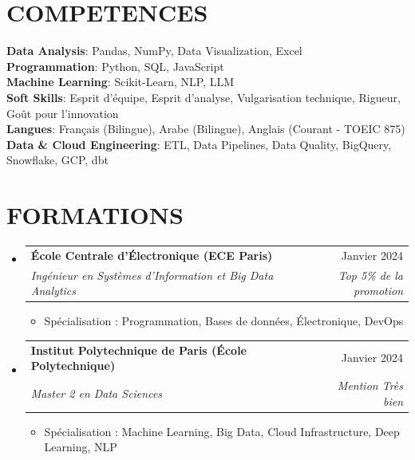 \documentclass[11pt,a4paper]{article}
\makeatletter
\newcommand{\resumeItem}[1]{
  \item\footnotesize{
    {#1 \vspace{-1pt}}
  }
}
\newcommand{\resumeSubheading}[4]{
  \vspace{2pt}\item
    \begin{tabular*}{\textwidth}[t]{l@{\extracolsep{\fill}}r}
      {\footnotesize\textbf{#1}} & {\footnotesize#2} \\
      {\footnotesize\textit{#3}} & {\footnotesize\textit{#4}} \\
    \end{tabular*}\vspace{2pt}
}
\newcommand{\resumeSubHeadingListStart}{\begin{itemize}[leftmargin=0in, label={}]}
\newcommand{\resumeSubHeadingListEnd}{\end{itemize}}
\newcommand{\resumeItemListStart}{\begin{itemize}[label={\textbullet}]}
\newcommand{\resumeItemListEnd}{\end{itemize}\vspace{0pt}}
\makeatother
\begin{document}
\section{COMPETENCES}
\begin{itemize}[leftmargin=0in, label={}]
\footnotesize{\item{
{\footnotesize\textbf{Data Analysis}:} {\footnotesize Pandas, NumPy, Data Visualization, Excel} \\
\vspace{3pt}
{\footnotesize\textbf{Programmation}:} {\footnotesize Python, SQL, JavaScript} \\
\vspace{3pt}
{\footnotesize\textbf{Machine Learning}:} {\footnotesize Scikit-Learn, NLP, LLM} \\
\vspace{3pt}
{\footnotesize\textbf{Soft Skills}:} {\footnotesize Esprit d'équipe, Esprit d'analyse, Vulgarisation technique, Rigueur, Goût pour l'innovation} \\
\vspace{3pt}
{\footnotesize\textbf{Langues}:} {\footnotesize Français (Bilingue), Arabe (Bilingue), Anglais (Courant - TOEIC 875)} \\
\vspace{3pt}
{\footnotesize\textbf{Data \& Cloud Engineering}:} {\footnotesize ETL, Data Pipelines, Data Quality, BigQuery, Snowflake, GCP, dbt}
}
}
\end{itemize}

\section{FORMATIONS}
\resumeSubHeadingListStart
    \resumeSubheading
      {École Centrale d'Électronique (ECE Paris)}
      {Janvier 2024}
      {Ingénieur en Systèmes d'Information et Big Data Analytics}
      {Top 5\% de la promotion}
      \resumeItemListStart
        \resumeItem{Spécialisation : Programmation, Bases de données, Électronique, DevOps}
      \resumeItemListEnd
    \resumeSubheading
      {Institut Polytechnique de Paris (École Polytechnique)}
      {Janvier 2024}
      {Master 2 en Data Sciences}
      {Mention Très bien}
      \resumeItemListStart
        \resumeItem{Spécialisation : Machine Learning, Big Data, Cloud Infrastructure, Deep Learning, NLP}
      \resumeItemListEnd
  \resumeSubHeadingListEnd
\end{document}
